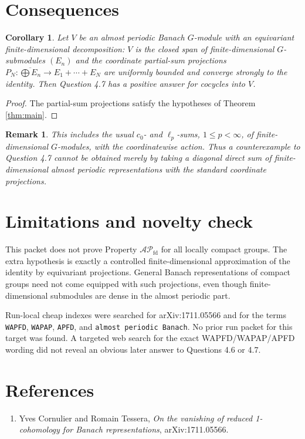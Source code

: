\documentclass[11pt]{article}
\newtheorem{corollary}{Corollary}
\newtheorem{remark}{Remark}
\newcommand{\APfd}{\mathcal{AP}_{\mathrm{fd}}}
\begin{document}
\section*{Consequences}

\begin{corollary}
Let $V$ be an almost periodic Banach $G$-module with an equivariant
finite-dimensional decomposition: $V$ is the closed span of finite-dimensional
$G$-submodules $(E_n)$ and the coordinate partial-sum projections
$P_N:\overline{\bigoplus E_n}\to E_1+\cdots+E_N$ are uniformly bounded and
converge strongly to the identity.  Then Question 4.7 has a positive answer for
cocycles into $V$.
\end{corollary}

\begin{proof}
The partial-sum projections satisfy the hypotheses of Theorem \ref{thm:main}.
\end{proof}

\begin{remark}
This includes the usual $c_0$- and $\ell_p$-sums, $1\le p<\infty$, of
finite-dimensional $G$-modules, with the coordinatewise action.  Thus a
counterexample to Question 4.7 cannot be obtained merely by taking a diagonal
direct sum of finite-dimensional almost periodic representations with the
standard coordinate projections.
\end{remark}

\section*{Limitations and novelty check}

This packet does not prove Property $\APfd$ for all locally compact groups.  The
extra hypothesis is exactly a controlled finite-dimensional approximation of
the identity by equivariant projections.  General Banach representations of
compact groups need not come equipped with such projections, even though
finite-dimensional submodules are dense in the almost periodic part.

Run-local cheap indexes were searched for arXiv:1711.05566 and for the terms
\texttt{WAPFD}, \texttt{WAPAP}, \texttt{APFD}, and \texttt{almost periodic
Banach}.  No prior run packet for this target was found.  A targeted web search
for the exact WAPFD/WAPAP/APFD wording did not reveal an obvious later answer
to Questions 4.6 or 4.7.

\section*{References}

\begin{enumerate}
\item Yves Cornulier and Romain Tessera, \emph{On the vanishing of reduced
1-cohomology for Banach representations}, arXiv:1711.05566.
\end{enumerate}
\end{document}

